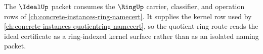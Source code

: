 The $\IdealUp$ packet consumes the $\RingUp$ carrier, classifier, and operation rows of \autoref{ch:concrete-instances-ring-namecert}. It supplies the kernel row used by \autoref{ch:concrete-instances-quotientring-namecert}, so the quotient-ring route reads the ideal certificate as a ring-indexed kernel surface rather than as an isolated naming packet.

